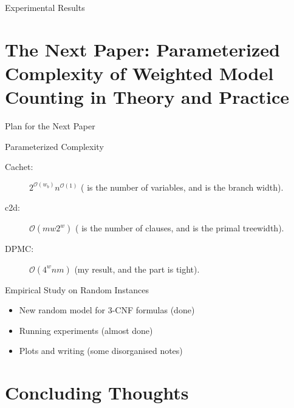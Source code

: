 \documentclass{beamer}
\begin{document}
\begin{frame}{Experimental Results}
  
\end{frame}

\section{The Next Paper: Parameterized Complexity of Weighted Model Counting in
  Theory and Practice}

\begin{frame}{Plan for the Next Paper}
  \begin{block}{Parameterized Complexity}
    \begin{description}
    \item[Cachet:] \alert{$2^{\mathcal{O}(w_b)}n^{\mathcal{O}(1)}$}
      ( is the number of variables, and  is the
      branch width).
    \item[c2d:] \alert{$\mathcal{O}(mw2^w)$} ( is the number
      of clauses, and  is the primal treewidth).
    \item[DPMC:] \alert{$\mathcal{O}(4^wnm)$} (my result, and the
       part is tight).
    \end{description}
  \end{block}
  \begin{block}{Empirical Study on Random Instances}
  \begin{itemize}
  \item New random model for 3-CNF formulas (done)
  \item Running experiments (almost done)
  \item Plots and writing (some disorganised notes)
  \end{itemize}
  \end{block}
\end{frame}

\section{Concluding Thoughts}
\end{document}
